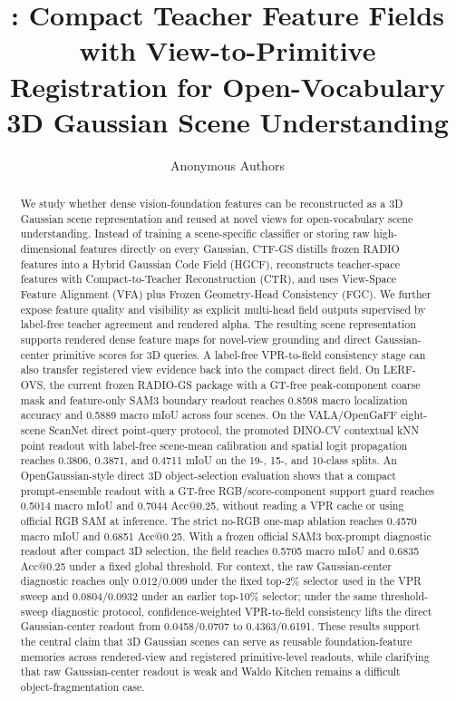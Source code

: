 \documentclass[10pt,twocolumn,letterpaper]{article}
\title{\method{}: Compact Teacher Feature Fields with View-to-Primitive Registration for Open-Vocabulary 3D Gaussian Scene Understanding}
\author{Anonymous Authors}
\date{}
\newcommand{\method}{CTF-GS}
\newcommand{\project}{RADIO-GS}
\begin{document}
\maketitle

\begin{abstract}
We study whether dense vision-foundation features can be reconstructed as a
3D Gaussian scene representation and reused at novel views for open-vocabulary
scene understanding. Instead of training a scene-specific classifier or storing
raw high-dimensional features directly on every Gaussian, \method{} distills
frozen RADIO features into a Hybrid Gaussian Code Field (HGCF), reconstructs
teacher-space features with Compact-to-Teacher Reconstruction (CTR), and uses
View-Space Feature Alignment (VFA) plus Frozen Geometry-Head Consistency (FGC).
We further expose feature quality and visibility as explicit multi-head field
outputs supervised by label-free teacher agreement and rendered alpha.
The resulting scene representation supports rendered dense feature maps for
novel-view grounding and direct Gaussian-center primitive scores for 3D
queries. A label-free VPR-to-field consistency stage can also transfer
registered view evidence back into the compact direct field. On LERF-OVS, the current frozen \project{} package with a
GT-free peak-component coarse mask and feature-only SAM3 boundary readout reaches
0.8598 macro localization accuracy and 0.5889 macro mIoU across four scenes. On the VALA/OpenGaFF eight-scene
ScanNet direct point-query protocol, the promoted DINO-CV contextual kNN point
readout with label-free scene-mean calibration and spatial logit propagation
reaches 0.3806, 0.3871, and 0.4711 mIoU on the 19-, 15-, and 10-class splits. An
OpenGaussian-style direct 3D object-selection evaluation shows that a
compact prompt-ensemble readout with a GT-free RGB/score-component support guard
reaches 0.5014 macro mIoU and 0.7044 Acc@0.25, without reading a
VPR cache or using official RGB SAM at inference. The strict no-RGB one-map
ablation reaches 0.4570 macro mIoU and 0.6851 Acc@0.25. With a frozen official
SAM3 box-prompt diagnostic readout after
compact 3D selection, the field reaches 0.5705 macro mIoU and 0.6835 Acc@0.25
under a fixed global threshold. For context, the raw Gaussian-center
diagnostic reaches only 0.012/0.009 under the fixed top-2\% selector used in
the VPR sweep and 0.0804/0.0932 under an earlier top-10\% selector; under the
same threshold-sweep diagnostic protocol, confidence-weighted VPR-to-field
consistency lifts the direct Gaussian-center readout from 0.0458/0.0707 to
0.4363/0.6191. These results
support the central claim that 3D Gaussian scenes can serve as reusable
foundation-feature memories across rendered-view and registered primitive-level
readouts, while clarifying that raw Gaussian-center readout is weak and Waldo
Kitchen remains a difficult object-fragmentation case.
\end{abstract}
\end{document}
